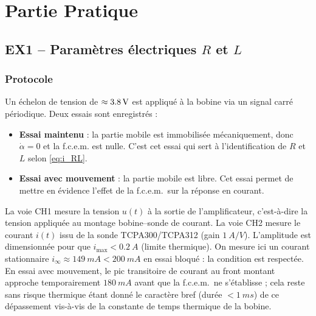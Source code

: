 \section{Partie Pratique}


\subsection{EX1 -- Paramètres électriques \texorpdfstring{\(R\)}{R} et \texorpdfstring{\(L\)}{L}}

\subsubsection{Protocole}

Un échelon de tension de \(\approx \SI{3{,}8}{V}\) est appliqué à la bobine via un signal carré périodique. Deux essais sont enregistrés :
\begin{itemize}
    \item \textbf{Essai maintenu} : la partie mobile est immobilisée mécaniquement, donc \(\dot{\alpha} = 0\) et la f.c.e.m. est nulle. C'est cet essai qui sert à l'identification de \(R\) et \(L\) selon \eqref{eq:i_RL}.
    \item \textbf{Essai avec mouvement} : la partie mobile est libre. Cet essai permet de mettre en évidence l'effet de la f.c.e.m.\ sur la réponse en courant.
\end{itemize}
La voie CH1 mesure la tension \(u(t)\) à la sortie de l'amplificateur, c'est-à-dire la tension appliquée au montage bobine--sonde de courant. La voie CH2 mesure le courant \(i(t)\) issu de la sonde TCPA300/TCPA312 (gain \(\SI{1}{A/V}\)). L'amplitude est dimensionnée pour que \(i_{\max} < \SI{0,2}{A}\) (limite thermique). On mesure ici un courant stationnaire \(i_\infty \approx \SI{149}{mA} < \SI{200}{mA}\) en essai bloqué : la condition est respectée. En essai avec mouvement, le pic transitoire de courant au front montant approche temporairement \(\SI{180}{mA}\) avant que la f.c.e.m.\ ne s'établisse ; cela reste sans risque thermique étant donné le caractère bref (durée \(<\!\!\SI{1}{ms}\)) de ce dépassement vis-à-vis de la constante de temps thermique de la bobine.

